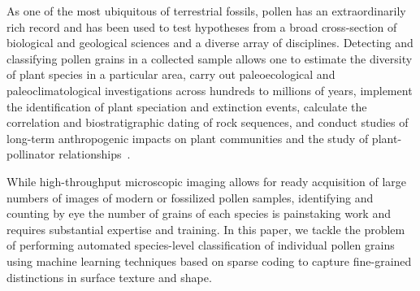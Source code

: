 \documentclass[10pt,twocolumn,letterpaper]{article}
\begin{document}
As one of the most ubiquitous of terrestrial fossils, pollen has an
extraordinarily rich record and has been used to test hypotheses from a broad
cross-section of biological and geological sciences and a diverse array of
disciplines.  Detecting and classifying pollen grains in a collected sample
allows one to estimate the diversity of plant species in a particular area,
carry out paleoecological and paleoclimatological investigations across
hundreds to millions of years, implement the identification of plant speciation
and extinction events, calculate the correlation and biostratigraphic dating of
rock sequences, and conduct studies of long-term anthropogenic impacts on plant
communities and the study of plant-pollinator
relationships~\cite{punyasena2012classifying}.



While high-throughput microscopic imaging allows for ready acquisition of large
numbers of images of modern or fossilized pollen samples, identifying and
counting by eye the number of grains of each species is painstaking work and
requires substantial expertise and training. In this paper, we tackle the
problem of performing automated species-level classification of individual
pollen grains using machine learning techniques based on sparse coding to
capture fine-grained distinctions in surface texture and shape.
\end{document}
